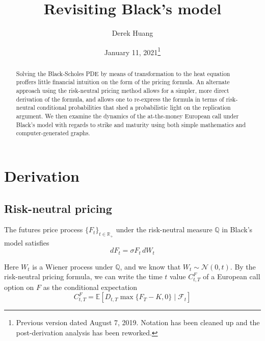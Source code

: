 \documentclass{article}
\title{Revisiting Black's model}
\author{Derek Huang}
\date{January 11, 2021\thanks{
    Previous version dated August 7, 2019. Notation has been cleaned up and the
    post-derivation analysis has been reworked.
}}
\numberwithin{equation}{section}
\begin{document}
\maketitle

\begin{abstract}
    Solving the Black-Scholes PDE by means of transformation to the heat
    equation\footnotemark{}
    proffers little financial intuition on the form of the pricing formula. An
    alternate approach using the risk-neutral pricing method allows for a
    simpler, more direct derivation of the formula, and allows one to re-express
    the formula in terms of risk-neutral conditional probabilities that shed a
    probabilistic light on the replication argument. We then examine the
    dynamics of the at-the-money European call under Black's model with regards
    to strike and maturity using both simple mathematics and computer-generated
    graphs.
\end{abstract}

\section{Derivation}

\subsection{Risk-neutral pricing}

The futures price process $ \{F_t\}_{t \in \mathbb{R}_+} $ under the
risk-neutral measure $ \mathbb{Q} $ in Black's model satisfies
\begin{equation} \label{black_dgbm}
    dF_t = \sigma F_t\,dW_t
\end{equation}

Here $ W_t $ is a Wiener process under $ \mathbb{Q} $, and we know that
$ W_t \sim \mathcal{N}(0, t) $. By the risk-neutral pricing formula, we can
write the time $ t $ value $ C_{t, T}^F $ of a European call option on $ F $ as
the conditional expectation
\begin{equation*}
    C_{t, T}^F = \mathbb{E}[D_{t, T}\max\{F_T - K, 0\} \mid \mathcal{F}_t]
\end{equation*}
\end{document}
